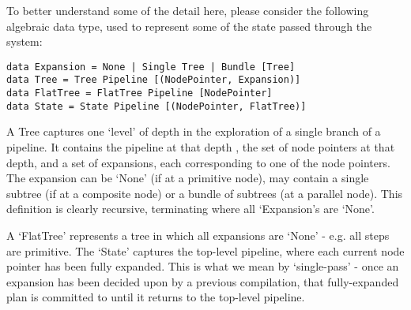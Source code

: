 \documentclass[10pt,a4paper]{article}
\newcommand{\npar}{\par\noindent\space}
\begin{document}
\begin{appendices}
\npar To better understand some of the detail here, please consider the following algebraic data type, used to represent some of the state passed through the system:
\begin{lstlisting}
data Expansion = None | Single Tree | Bundle [Tree]
data Tree = Tree Pipeline [(NodePointer, Expansion)]
data FlatTree = FlatTree Pipeline [NodePointer]
data State = State Pipeline [(NodePointer, FlatTree)]
\end{lstlisting}
\npar A Tree captures one `level' of depth in the exploration of a single branch of a pipeline. It contains the pipeline at that depth , the set of node pointers at that depth, and a set of expansions, each corresponding to one of the node pointers. The expansion can be `None' (if at a primitive node), may contain a single subtree (if at a composite node) or a bundle of subtrees (at a parallel node). This definition is clearly recursive, terminating where all `Expansion's are `None'.
\npar A `FlatTree' represents a tree in which all expansions are `None' - e.g. all steps are primitive. The `State' captures the top-level pipeline, where each current node pointer has been fully expanded. This is what we mean by `single-pass' - once an expansion has been decided upon by a previous compilation, that fully-expanded plan is committed to until it returns to the top-level pipeline.


\end{appendices}
\end{document}
